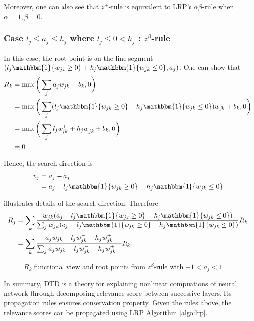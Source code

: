 Moreover, one can also see that $z^+$-rule is equivalent to LRP's $\alpha\beta$-rule when $\alpha=1, \beta=0$. 


\subsubsection{Case $l_j \le a_j \le h_j$ where $l_j \le 0 < h_j $ : $z^\beta$-rule}
In this case, the root point is on the line segment $( l_j \mathbbm{1}\{ w_{jk}  \ge 0 \}  + h_j \mathbbm{1}\{ w_{jk}  \le 0 \}  , a_j ) $. One can show that 
\begin{align}
R_k &= \max \bigg( \sum_j a_j w_{jk } + b_k, 0 \bigg) \\
&=\max \bigg( \sum_j (l_j \mathbbm{1}\{ w_{jk}  \ge 0 \}  + h_j \mathbbm{1}\{ w_{jk}  \le 0 \} ) w_{jk } + b_k, 0 \bigg) \\
&= \max \bigg( \sum_j l_j w_{jk }^+   + h_j w_{jk }^-  + b_k, 0 \bigg) \\
&= 0
\end{align}

Hence,  the search direction is 
\begin{align*}
	v_j &= a_j - \tilde{a}_j \\
	&=a_j  - l_j \mathbbm{1}\{ w_{jk}  \ge 0 \}  - h_j \mathbbm{1}\{ w_{jk}  \le 0 \}
\end{align*}

\addfigure{\ref{fig:zbeta_rule_cases}} illustrates details of the search direction. Therefore, 
\begin{align*}
		R_j &=	\sum_k \frac{ w_{jk}  (a_j  - l_j \mathbbm{1}\{ w_{jk}  \ge 0 \}  - h_j \mathbbm{1}\{ w_{jk}  \le 0 \}) }{\sum_{j} w_{jk}  (a_j  - l_j \mathbbm{1}\{ w_{jk}  \ge 0 \}  - h_j \mathbbm{1}\{ w_{jk}  \le 0 \}) }  R_k\\
		&=	\sum_k  \frac{ a_j  w_{jk} - l_j w_{jk}^- - h_j w_{jk}^+  }{\sum_{j}   a_j  w_{jk} - l_j w_{jk}^- - h_j w_{jk}^+  -}  R_k
\end{align*}

\begin{figure}[!htb]
\centering
{}
\caption{$R_k$ functional view and root points from $z^\beta$-rule with $-1 < a_j < 1$ }
\label{fig:zbeta_rule_cases}
\end{figure}


In summary, DTD is a theory for explaining nonlinear compuations of neural network through decomposing relevance score between successive layers. Its propagation rules ensures conservation property. Given the rules above, the relevance scores can be propagated using LRP Algorithm \ref{algo:lrp}.

